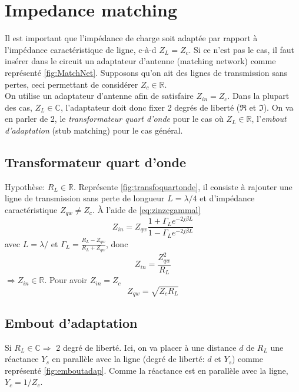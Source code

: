 \section{Impedance matching}
Il est important que l'impédance de charge soit adaptée par rapport à l'impédance caractéristique de ligne, c-à-d $Z_L=Z_c$. Si ce n'est pas le cas, il faut insérer dans le circuit un adaptateur d'antenne (matching network) comme représenté \autoref{fig:MatchNet}. Supposons qu'on ait des lignes de transmission sans pertes, ceci permettant de considérer $Z_c\in\mathbb{R}$.\\

On utilise un adaptateur d'antenne afin de satisfaire $Z_{in} = Z_c$. Dans la plupart des cas, $Z_L\in\mathbb{C}$, l'adaptateur doit donc fixer 2 degrés de liberté ($\Re$ et $\Im$). On va en parler de 2, le \emph{transformateur quart d'onde} pour le cas où $Z_L\in\mathbb{R}$, l'\emph{embout d'adaptation} (stub matching) pour le cas général.
\subsection{Transformateur quart d'onde}
Hypothèse: $R_L\in\mathbb{R}$. Représente \autoref{fig:transfoquartonde}, il consiste à rajouter une ligne de transmission sans perte de longueur $L=\lambda/4$ et d'impédance caractéristique $Z_{qw}\neq Z_c$. À l'aide de \eqref{eq:zinzcgammal} 
\begin{equation}
	Z_{in}= Z_{qw}\frac{1+\Gamma_L e^{-2j\beta L}}{1-\Gamma_L e^{-2j\beta L}}
\end{equation}
avec $L=\lambda/$ et $\Gamma_L=\frac{R_L-Z_{qw}}{R_L+Z_{qw}}$, donc
\begin{equation}
	Z_{in}=\frac{Z_{qw}^2}{R_L}
\end{equation}
$\Rightarrow Z_{in}\in\mathbb{R}$.  Pour avoir $Z_{in}=Z_c$
\begin{equation}
	Z_{qw} = \sqrt{Z_c R_L}
\end{equation}
\subsection{Embout d'adaptation}
Si $R_L\in\mathbb{C}\Rightarrow$ 2 degré de liberté. Ici, on va placer à une distance $d$ de $R_L$ une réactance $Y_s$ en parallèle avec la ligne (degré de liberté: $d$ et $Y_s$) comme représenté \autoref{fig:emboutadap}. Comme la réactance est en parallèle avec la ligne, $Y_c=1/Z_c$.\\

